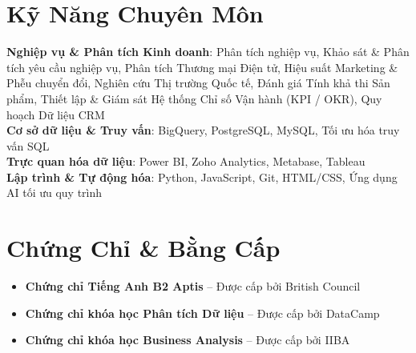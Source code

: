 \documentclass[letterpaper,11pt]{article}
\newcommand{\resumeItem}[1]{
  \item\small{
    {#1 \vspace{1pt}}
  }
}
\newcommand{\resumeItemListStart}{\begin{itemize}[leftmargin=0.15in, itemsep=2.5pt, topsep=2pt, parsep=1.5pt]}
\newcommand{\resumeItemListEnd}{\end{itemize}\vspace{2pt}}
\begin{document}
\section*{Kỹ Năng Chuyên Môn}
 \begin{itemize}[leftmargin=0.15in, label={}]
    \small{\item{
     \textbf{Nghiệp vụ \& Phân tích Kinh doanh}: {Phân tích nghiệp vụ, Khảo sát \& Phân tích yêu cầu nghiệp vụ, Phân tích Thương mại Điện tử, Hiệu suất Marketing \& Phễu chuyển đổi, Nghiên cứu Thị trường Quốc tế, Đánh giá Tính khả thi Sản phẩm, Thiết lập \& Giám sát Hệ thống Chỉ số Vận hành (KPI / OKR), Quy hoạch Dữ liệu CRM} \\ \vspace{2pt}
     \textbf{Cơ sở dữ liệu \& Truy vấn}: {BigQuery, PostgreSQL, MySQL, Tối ưu hóa truy vấn SQL} \\ \vspace{2pt}
     \textbf{Trực quan hóa dữ liệu}: {Power BI, Zoho Analytics, Metabase, Tableau} \\ \vspace{2pt}
     \textbf{Lập trình \& Tự động hóa}: {Python, JavaScript, Git, HTML/CSS, Ứng dụng AI tối ưu quy trình}
    }}
 \end{itemize}

\section*{Chứng Chỉ \& Bằng Cấp}
        \resumeItemListStart
      \resumeItem{\textbf{Chứng chỉ Tiếng Anh B2 Aptis} -- Được cấp bởi British Council}
      \resumeItem{\textbf{Chứng chỉ khóa học Phân tích Dữ liệu} -- Được cấp bởi DataCamp}
      \resumeItem{\textbf{Chứng chỉ khóa học Business Analysis} -- Được cấp bởi IIBA}
      \resumeItemListEnd

\end{document}
